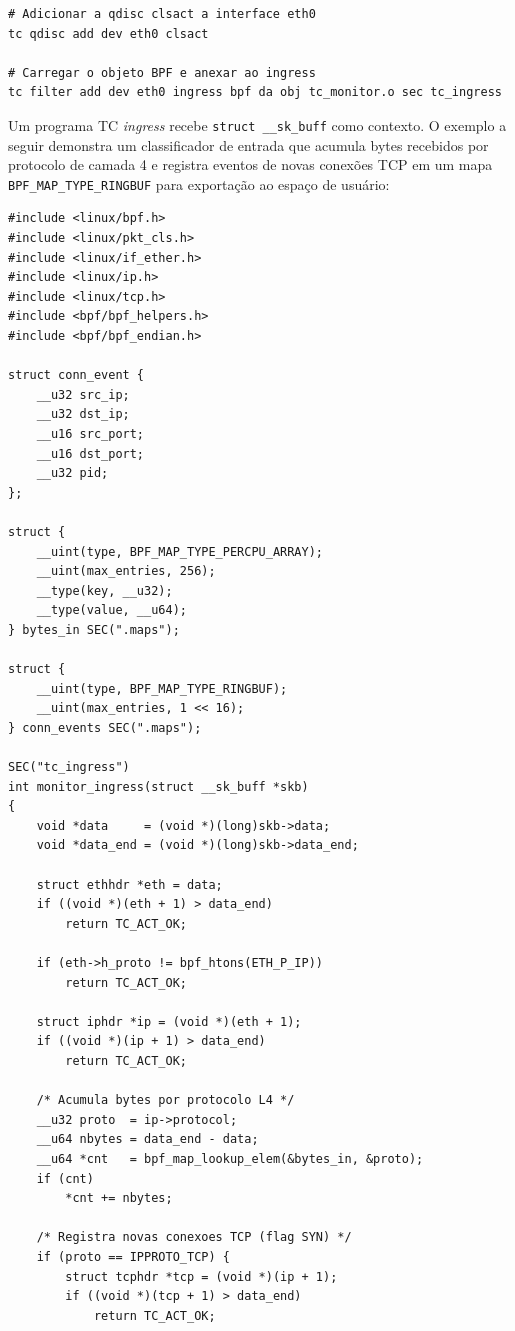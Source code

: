 \begin{lstlisting}[caption={Configuração da qdisc clsact e anexação de programa eBPF no ingress.}, label=lst:tc-ingress-setup]
# Adicionar a qdisc clsact a interface eth0
tc qdisc add dev eth0 clsact

# Carregar o objeto BPF e anexar ao ingress
tc filter add dev eth0 ingress bpf da obj tc_monitor.o sec tc_ingress
\end{lstlisting}

Um programa TC \textit{ingress} recebe \texttt{struct \_\_sk\_buff} como contexto.
O exemplo a seguir demonstra um classificador de entrada que acumula bytes recebidos
por protocolo de camada 4 e registra eventos de novas conexões TCP em um mapa
\texttt{BPF\_MAP\_TYPE\_RINGBUF} para exportação ao espaço de usuário:

\begin{lstlisting}[caption={Programa TC ingress que monitora bytes e novas conexões TCP.}, label=lst:tc-ingress-prog]
#include <linux/bpf.h>
#include <linux/pkt_cls.h>
#include <linux/if_ether.h>
#include <linux/ip.h>
#include <linux/tcp.h>
#include <bpf/bpf_helpers.h>
#include <bpf/bpf_endian.h>

struct conn_event {
    __u32 src_ip;
    __u32 dst_ip;
    __u16 src_port;
    __u16 dst_port;
    __u32 pid;
};

struct {
    __uint(type, BPF_MAP_TYPE_PERCPU_ARRAY);
    __uint(max_entries, 256);
    __type(key, __u32);
    __type(value, __u64);
} bytes_in SEC(".maps");

struct {
    __uint(type, BPF_MAP_TYPE_RINGBUF);
    __uint(max_entries, 1 << 16);
} conn_events SEC(".maps");

SEC("tc_ingress")
int monitor_ingress(struct __sk_buff *skb)
{
    void *data     = (void *)(long)skb->data;
    void *data_end = (void *)(long)skb->data_end;

    struct ethhdr *eth = data;
    if ((void *)(eth + 1) > data_end)
        return TC_ACT_OK;

    if (eth->h_proto != bpf_htons(ETH_P_IP))
        return TC_ACT_OK;

    struct iphdr *ip = (void *)(eth + 1);
    if ((void *)(ip + 1) > data_end)
        return TC_ACT_OK;

    /* Acumula bytes por protocolo L4 */
    __u32 proto  = ip->protocol;
    __u64 nbytes = data_end - data;
    __u64 *cnt   = bpf_map_lookup_elem(&bytes_in, &proto);
    if (cnt)
        *cnt += nbytes;

    /* Registra novas conexoes TCP (flag SYN) */
    if (proto == IPPROTO_TCP) {
        struct tcphdr *tcp = (void *)(ip + 1);
        if ((void *)(tcp + 1) > data_end)
            return TC_ACT_OK;


\end{lstlisting}
